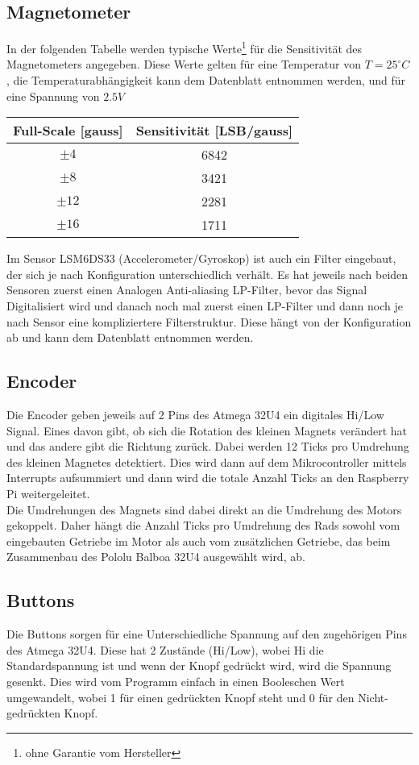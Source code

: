 \documentclass[a4paper, 12pt]{article}
\begin{document}
\subsection*{Magnetometer}In der folgenden Tabelle werden typische Werte\footnote{ohne Garantie vom Hersteller} für die Sensitivität des Magnetometers angegeben.
Diese Werte gelten für eine Temperatur von $T = 25^\circ C$, die Temperaturabhängigkeit kann dem Datenblatt entnommen werden, und für eine Spannung von $2.5 V$
\begin{center}
	\begin{tabular}{c | c}
		Full-Scale [gauss] & Sensitivität [LSB/gauss]\\\hline
		$\pm 4$ & 6842\\
		$\pm 8$ & 3421\\
		$\pm 12$ & 2281\\
		$\pm 16$ & 1711
	\end{tabular}
\end{center}
Im Sensor LSM6DS33 (Accelerometer/Gyroskop) ist auch ein Filter eingebaut, der sich je nach Konfiguration unterschiedlich verhält. Es hat jeweils nach beiden Sensoren zuerst einen Analogen Anti-aliasing LP-Filter, bevor das Signal Digitalisiert wird und danach noch mal zuerst einen LP-Filter und dann noch je nach Sensor eine kompliziertere Filterstruktur. Diese hängt von der Konfiguration ab und kann dem Datenblatt entnommen werden.

\subsection*{Encoder}
Die Encoder geben jeweils auf 2 Pins des Atmega 32U4 ein digitales Hi/Low Signal. Eines davon gibt, ob sich die Rotation des kleinen Magnets verändert hat und das andere gibt die Richtung zurück. Dabei werden 12 Ticks pro Umdrehung des kleinen Magnetes detektiert. Dies wird dann auf dem Mikrocontroller mittels Interrupts aufsummiert und dann wird die totale Anzahl Ticks an den Raspberry Pi weitergeleitet.\\
Die Umdrehungen des Magnets sind dabei direkt an die Umdrehung des Motors gekoppelt. Daher hängt die Anzahl Ticks pro Umdrehung des Rads sowohl vom eingebauten Getriebe im Motor als auch vom zusätzlichen Getriebe, das beim Zusammenbau des Pololu Balboa 32U4 ausgewählt wird, ab.

\subsection*{Buttons}
Die Buttons sorgen für eine Unterschiedliche Spannung auf den zugehörigen Pins des Atmega 32U4. Diese hat 2 Zustände (Hi/Low), wobei Hi die Standardspannung ist und wenn der Knopf gedrückt wird, wird die Spannung gesenkt. Dies wird vom Programm einfach in einen Booleschen Wert umgewandelt, wobei 1 für einen gedrückten Knopf steht und 0 für den Nicht-gedrückten Knopf.
\end{document}
